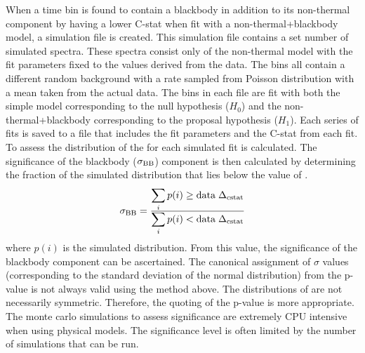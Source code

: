 When a time bin is found to contain a blackbody in addition to its
non-thermal component by having a lower C-stat when fit with a
non-thermal+blackbody model, a simulation file is created. This
simulation file contains a set number of simulated spectra. These
spectra consist only of the non-thermal model with the fit parameters
fixed to the values derived from the data. The bins all contain a
different random background with a rate sampled from Poisson
distribution with a mean taken from the actual data. The bins in each
file are fit with both the simple model corresponding to the null
hypothesis ($H_0$) and the non-thermal+blackbody corresponding to the
proposal hypothesis ($H_1$). Each series of fits is saved to a file
that includes the fit parameters and the C-stat from each fit. To
assess the distribution of \dcstat the \dcstat for each simulated fit
is calculated. The significance of the blackbody ($\sigma_{\rm BB}$)
component is then calculated by determining the fraction of the
simulated distribution that lies below the value of \dcstat.
\begin{equation}
  \label{eq:sigtest}
  \sigma_{\rm BB}=\dover{\sum_i p(i)\ge {\rm data}\;\Delta_{\rm cstat} }{\sum_i p(i)< {\rm data}\;\Delta_{\rm cstat}}
\end{equation}
where $p(i)$ is the simulated \dcstat distribution. From this value,
the significance of the blackbody component can be ascertained. The
canonical assignment of $\sigma$ values (corresponding to the standard
deviation of the normal distribution) from the p-value is not always
valid using the method above. The distributions of \dcstat are not
necessarily symmetric. Therefore, the quoting of the p-value is more
appropriate. The monte carlo simulations to assess significance are
extremely CPU intensive when using physical models. The significance
level is often limited by the number of simulations that can be run.

